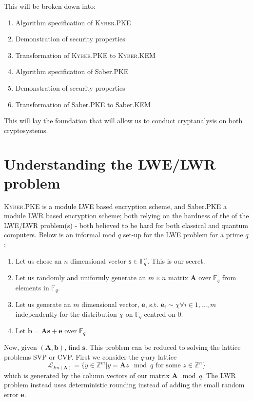 \documentclass[a4paper, 10pt]{article}
\theoremstyle{definition}
\begin{document}
This will be broken down into:
\begin{enumerate}
    \item Algorithm specification of \textsc{Kyber}.\ac{PKE}
    \item Demonstration of security properties
    \item Transformation of \textsc{Kyber}.\ac{PKE} to \textsc{Kyber}.\ac{KEM}
    \item Algorithm specification of Saber.\ac{PKE}
    \item Demonstration of security properties
    \item Transformation of Saber.\ac{PKE} to Saber.\ac{KEM}
\end{enumerate}
This will lay the foundation that will allow us to conduct cryptanalysis on both cryptosystems.

\newpage

\section{Understanding the LWE/LWR problem}

\textsc{Kyber}.\ac{PKE} is a module \ac{LWE} based encryption scheme, and Saber.\ac{PKE} a module \ac{LWR} based encryption scheme; both relying on the hardness of the of the \ac{LWE}/\ac{LWR} problem(s) - both believed to be hard for both classical and quantum computers. Below is an informal mod $q$ set-up for the \ac{LWE} problem for a prime $q$:

\begin{enumerate}
    \item Let us chose an $n$ dimensional vector $\mathbf{s} \in \mathbb{F}^n_q$. This is our secret.
    \item Let us randomly and uniformly generate an $m\times n$ matrix $\mathbf{A} $ over $\mathbb{F}_q$ from elements in $\mathbb{F} _q$.
    \item Let us generate an $m$ dimensional vector, $\mathbf{e}$, s.t. $\mathbf{e}_i\sim \chi \forall i \in {1,...,m}$ independently for the distribution $\chi$ on $\mathbb{F}_q$ centred on $0$.
    \item Let $\mathbf{b} = \mathbf{A}\mathbf{s}+\mathbf{e}$ over $\mathbb{F}_q$
\end{enumerate}

Now, given $(\mathbf{A},\mathbf{b})$, find $\mathbf{s}$. This problem can be reduced to solving the lattice problems \ac{SVP} or \ac{CVP}. First we consider the  $q$-ary lattice
\[\mathcal{L}_{Im(\mathbf{A})}=\{y \in \mathbb{Z}^m | y=\mathbf{A}z\mod{q} \mbox{ for some } z \in \mathbb{Z}^n \}\]
which is generated by the column vectors of our matrix $\mathbf{A}\mod{q}$. The \ac{LWR} problem instead uses deterministic rounding instead of adding the small random error $\mathbf{e}$\cite{LWR}.
\end{document}
